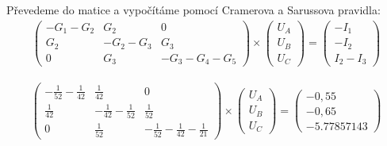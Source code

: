 Převedeme do matice a vypočítáme pomocí Cramerova a Sarussova pravidla:
\begin{gather*}
    \begin{pmatrix}
        -G_1 -G_2 & G_2 & 0 \\
        G_2 & -G_2 - G_3 & G_3 \\
        0 & G_3 & -G_3 - G_4 - G_5
    \end{pmatrix}
    \times
    \begin{pmatrix}
        U_A \\
        U_B \\
        U_C
    \end{pmatrix}
    =
    \begin{pmatrix}
        -I_1 \\
        -I_2 \\
        I_2 - I_3
    \end{pmatrix}
\end{gather*}

\begin{gather*}
    \begin{pmatrix}
        - \frac{1}{52} - \frac{1}{42} & \frac{1}{42} & 0 \\
        \frac{1}{42} & - \frac{1}{42} - \frac{1}{52} & \frac{1}{52} \\
        0 & \frac{1}{52} & - \frac{1}{52} - \frac{1}{42} - \frac{1}{21}
    \end{pmatrix}
    \times
    \begin{pmatrix}
        U_A \\
        U_B \\
        U_C
    \end{pmatrix}
    =
    \begin{pmatrix}
        -0,55 \\
        -0,65 \\
        -5.77857143
    \end{pmatrix}
\end{gather*}

